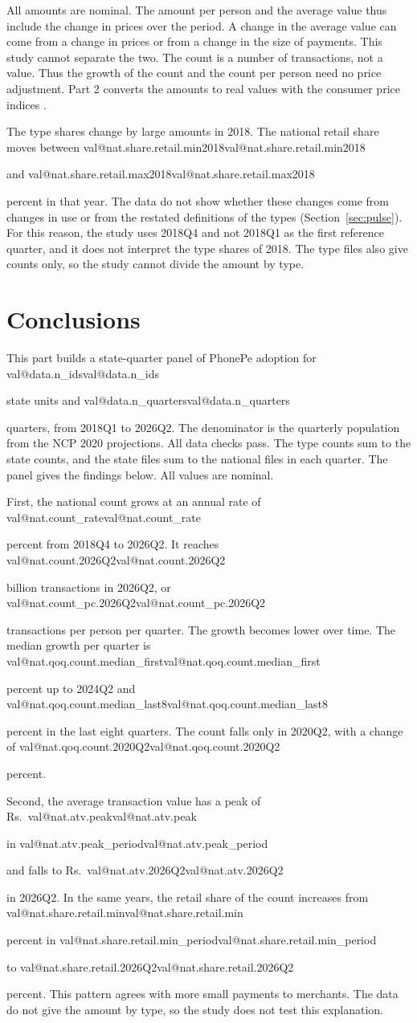 \documentclass[11pt,a4paper]{article}
\makeatletter
\newcommand{\val}[1]{\ifcsname val@#1\endcsname\csname val@#1\endcsname\else
  \PackageError{study}{Unknown value key `#1'}{Run Rscript src/R/part1_study.R}\fi}
\makeatother
\begin{document}
All amounts are nominal. The amount per person and the average value thus include the change in prices over the period. A change in the average value can come from a change in prices or from a change in the size of payments. This study cannot separate the two. The count is a number of transactions, not a value. Thus the growth of the count and the count per person need no price adjustment. Part 2 converts the amounts to real values with the consumer price indices \citep{mospi_cpi}.

The type shares change by large amounts in 2018. The national retail share moves between \val{nat.share.retail.min2018} and \val{nat.share.retail.max2018} percent in that year. The data do not show whether these changes come from changes in use or from the restated definitions of the types (Section~\ref{sec:pulse}). For this reason, the study uses 2018Q4 and not 2018Q1 as the first reference quarter, and it does not interpret the type shares of 2018. The type files also give counts only, so the study cannot divide the amount by type.

\section{Conclusions}\label{sec:conclusions}
This part builds a state-quarter panel of PhonePe adoption for \val{data.n_ids} state units and \val{data.n_quarters} quarters, from 2018Q1 to 2026Q2. The denominator is the quarterly population from the NCP 2020 projections. All data checks pass. The type counts sum to the state counts, and the state files sum to the national files in each quarter. The panel gives the findings below. All values are nominal.

First, the national count grows at an annual rate of \val{nat.count_rate} percent from 2018Q4 to 2026Q2. It reaches \val{nat.count.2026Q2} billion transactions in 2026Q2, or \val{nat.count_pc.2026Q2} transactions per person per quarter. The growth becomes lower over time. The median growth per quarter is \val{nat.qoq.count.median_first} percent up to 2024Q2 and \val{nat.qoq.count.median_last8} percent in the last eight quarters. The count falls only in 2020Q2, with a change of \val{nat.qoq.count.2020Q2} percent.

Second, the average transaction value has a peak of Rs.~\val{nat.atv.peak} in \val{nat.atv.peak_period} and falls to Rs.~\val{nat.atv.2026Q2} in 2026Q2. In the same years, the retail share of the count increases from \val{nat.share.retail.min} percent in \val{nat.share.retail.min_period} to \val{nat.share.retail.2026Q2} percent. This pattern agrees with more small payments to merchants. The data do not give the amount by type, so the study does not test this explanation.
\end{document}
